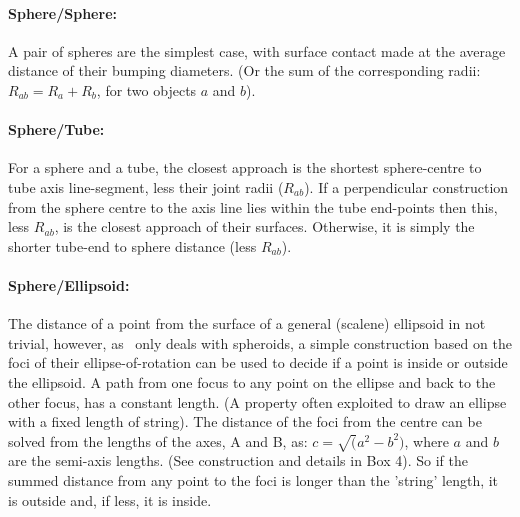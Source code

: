 {{{{{\paragraph{Sphere/Sphere:\\}

A pair of spheres are the simplest case, with surface contact made at the average distance of their bumping diameters.
(Or the sum of the corresponding radii: $R_{ab} = R_a + R_b$, for two objects $a$ and $b$).

\paragraph{Sphere/Tube:\\}

For a sphere and a tube, the closest approach is the shortest sphere-centre to tube axis 
line-segment, less their joint radii ($R_{ab}$).   If a perpendicular construction from the 
sphere centre to the axis line lies within the tube end-points then this, less $R_{ab}$,
is the closest approach of their surfaces.  Otherwise, it is simply the shorter tube-end to
sphere distance (less $R_{ab}$).

\paragraph{Sphere/Ellipsoid:\\}

The distance of a point from the surface of a general (scalene) ellipsoid in not trivial,
however, as \NAME\ only deals with spheroids, a simple construction based on the foci of
their ellipse-of-rotation can be used to decide if a point is inside or outside the ellipsoid.
A path from one focus to any point on the ellipse and back to the other focus, has a constant
length.  (A property often exploited to draw an ellipse with a fixed length of string).
The distance of the foci from the centre can be solved from the lengths of the axes, A and B,
as: $c = \surd(a^2-b^2)$, where $a$ and $b$ are the semi-axis lengths.  (See construction and details in Box 4).
So if the summed distance from any point to the foci is longer than the 'string' length, it is outside
and, if less, it is inside.

}}}}}
